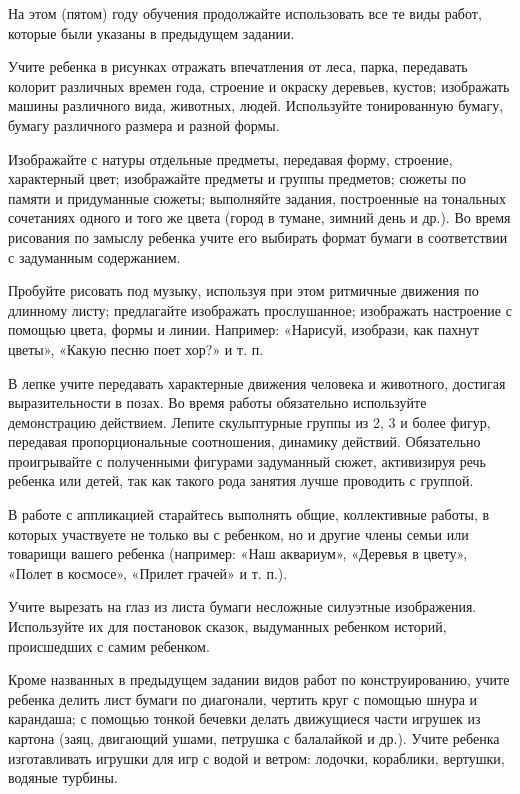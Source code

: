 \documentclass{book}
\begin{document}
На этом (пятом) году обучения продолжайте использовать все те виды
работ, которые были указаны в предыдущем задании.

Учите ребенка в рисунках отражать впечатления от леса, парка, передавать
колорит различных времен года, строение и окраску деревьев, кустов;
изображать машины различного вида, животных, людей. Используйте
тонированную бумагу, бумагу различного размера и разной формы.

Изображайте с натуры отдельные предметы, передавая форму, строение,
характерный цвет; изображайте предметы и группы предметов; сюжеты по
памяти и придуманные сюжеты; выполняйте задания, построенные на
тональных сочетаниях одного и того же цвета (город в тумане, зимний день
и др.). Во время рисования по замыслу ребенка учите его выбирать формат
бумаги в соответствии с задуманным содержанием.

Пробуйте рисовать под музыку, используя при этом ритмичные движения по
длинному листу; предлагайте изображать прослушанное; изображать
настроение с помощью цвета, формы и линии. Например: «Нарисуй, изобрази,
как пахнут цветы», «Какую песню поет хор?» и т. п.

В лепке учите передавать характерные движения человека и животного,
достигая выразительности в позах. Во время работы обязательно
используйте демонстрацию действием. Лепите скульптурные группы из 2, 3 и
более фигур, передавая пропорциональные соотношения, динамику действий.
Обязательно проигрывайте с полученными фигурами задуманный сюжет,
активизируя речь ребенка или детей, так как такого рода занятия лучше
проводить с группой.

В работе с аппликацией старайтесь выполнять общие, коллективные работы,
в которых участвуете не только вы с ребенком, но и другие члены семьи
или товарищи вашего ребенка (например: «Наш аквариум», «Деревья в
цвету», «Полет в космосе», «Прилет грачей» и т. п.).

Учите вырезать на глаз из листа бумаги несложные силуэтные изображения.
Используйте их для постановок сказок, выдуманных ребенком историй,
происшедших с самим ребенком.

Кроме названных в предыдущем задании видов работ по конструированию,
учите ребенка делить лист бумаги по диагонали, чертить круг с помощью
шнура и карандаша; с помощью тонкой бечевки делать движущиеся части
игрушек из картона (заяц, двигающий ушами, петрушка с балалайкой и др.).
Учите ребенка изготавливать игрушки для игр с водой и ветром: лодочки,
кораблики, вертушки, водяные турбины.
\end{document}
